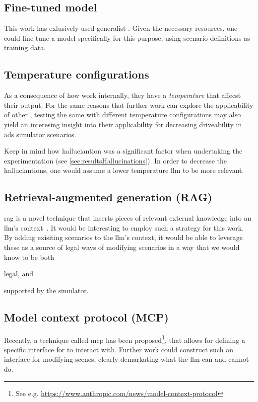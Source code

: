 \subsection{Fine-tuned model}

This work has exlusively used generalist . Given the necessary resources, one could
fine-tune a model specifically for this purpose, using scenario definitions as training data.

\subsection{Temperature configurations}
As a consequence of how  work internally, they have a \emph{temperature} that
affecst their output. For the same reasons that further work can explore the applicability of other
, testing the same  with different temperature configurations may
also yield an interesing insight into their applicability for decreasing driveability in
\acrshort{ads} simulator scenarios.

Keep in mind how halluciantion was a significant factor when undertaking the experimentation (see
\cref{sec:resultsHallucinations}). In order to decrease the halluciantions, one would assume a lower
temperature \acrshort{llm} to be more relevant.

\subsection{Retrieval-augmented generation (RAG)}

\acrfull{rag} is a novel technique that inserts pieces of relevant external knowledge into an
\acrshort{llm}'s context~\cite[88-89]{llmSurvey}. It would be interesting to employ such a strategy
for this work. By adding exisiting scenarios to the \acrfull{llm}'s context, it would be able to
leverage these as a source of legal ways of modifying scenarios in a way that we would know to be
both \begin{inparaenum}
    \item legal, and
    \item supported by the simulator.
\end{inparaenum}

\subsection{Model context protocol (MCP)}

Recently, a technique called \acrfull{mcp} has been proposed\footnote{See e.g.
    \url{https://www.anthropic.com/news/model-context-protocol}}, that allows for defining a specific
interface for  to interact with. Further work could construct such an interface for
modifying scenes, clearly demarkating what the \acrshort{llm} can and cannot do.

